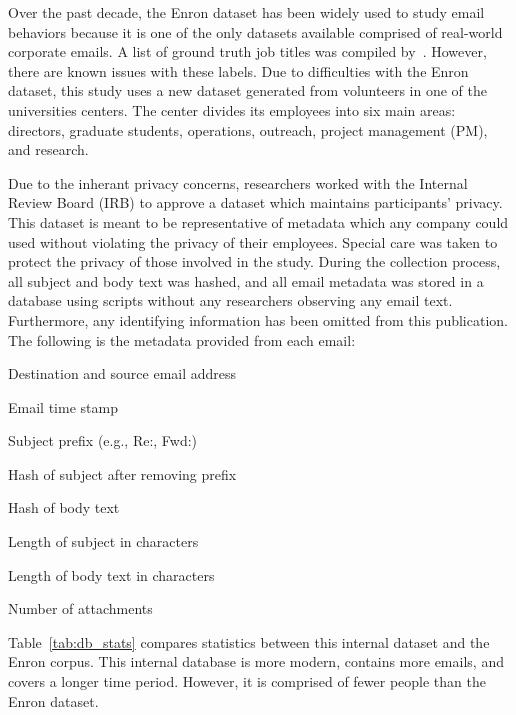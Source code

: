 \documentclass{article}
\begin{document}
Over the past decade, the Enron dataset has been widely used to study email behaviors because it is one of the only datasets available comprised of real-world corporate emails.  A list of ground truth job titles was compiled by~\cite{shetty_status_2004}.  However, there are known issues with these labels.  Due to difficulties with the Enron dataset, this study uses a new dataset generated from volunteers in one of the universities centers.  The center divides its employees into six main areas: directors, graduate students, operations, outreach, project management (PM), and research.

Due to the inherant privacy concerns, researchers worked with the Internal Review Board (IRB) to approve a dataset which maintains participants' privacy.  This dataset is meant to be representative of metadata which any company could used without violating the privacy of their employees.  Special care was taken to protect the privacy of those involved in the study.  During the collection process, all subject and body text was hashed, and all email metadata was stored in a database using scripts without any researchers observing any email text. Furthermore, any identifying information has been omitted from this publication.
The following is the metadata provided from each email:
\begin{compactitem}
\item Destination and source email address
\item Email time stamp
\item Subject prefix (e.g., Re:, Fwd:)
\item Hash of subject after removing prefix
\item Hash of body text
\item Length of subject in characters
\item Length of body text in characters
\item Number of attachments
\end{compactitem}

Table~\ref{tab:db_stats} compares statistics between this internal dataset and the Enron corpus.  This internal database is more modern, contains more emails, and covers a longer time period.  However, it is comprised of fewer people than the Enron dataset.
\end{document}
